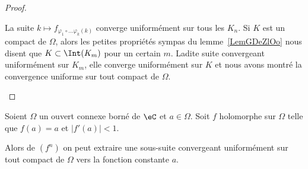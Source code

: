 \begin{proof}
\begin{subproof}

		La suite \( k\mapsto f_{\varphi_1\circ\ldots\varphi_k(k)}\) converge uniformément sur tous les \( K_n\). Si \( K\) est un compact de \( \Omega\), alors les petites propriétés sympas du lemme~\ref{LemGDeZlOo} nous disent que \( K\subset \Int(K_m)\) pour un certain \( m\). Ladite suite convergeant uniformément sur \( K_m\), elle converge uniformément sur \( K\) et nous avons montré la convergence uniforme sur tout compact de \( \Omega\).

	\end{subproof}
\end{proof}

\begin{corollary}
	Soient \( \Omega\) un ouvert connexe borné de \( \eC\) et \( a\in \Omega\). Soit \( f\) holomorphe sur \( \Omega\) telle que \( f(a)=a\) et \( | f'(a) |<1\).

	Alors de \( (f^n)\) on peut extraire une sous-suite convergeant uniformément sur tout compact de \( \Omega\) vers la fonction constante \( a\).
\end{corollary}

